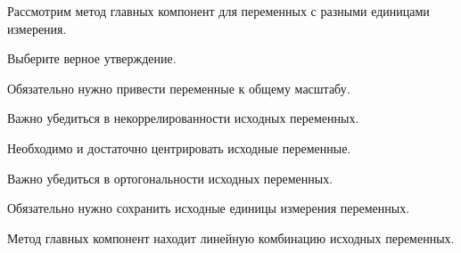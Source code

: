
\begin{question}
Рассмотрим метод главных компонент для переменных с разными единицами измерения.

Выберите верное утверждение.
\begin{answerlist}
  \item Обязательно нужно привести переменные к общему масштабу.
  \item Важно убедиться в некоррелированности исходных переменных.
  \item Необходимо и достаточно центрировать исходные переменные.
  \item Важно убедиться в ортогональности исходных переменных.
  \item Обязательно нужно сохранить исходные единицы измерения переменных.
\end{answerlist}
\end{question}

\begin{solution}
Метод главных компонент находит линейную комбинацию исходных переменных.
\end{solution}

